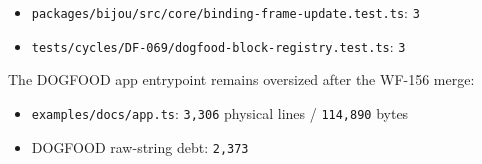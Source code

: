 \begin{itemize}
  \texttt{p\allowbreak{}a\allowbreak{}c\allowbreak{}k\allowbreak{}a\allowbreak{}g\allowbreak{}e\allowbreak{}s\allowbreak{}/\allowbreak{}b\allowbreak{}i\allowbreak{}j\allowbreak{}o\allowbreak{}u\allowbreak{}-\allowbreak{}t\allowbreak{}u\allowbreak{}i\allowbreak{}/\allowbreak{}s\allowbreak{}r\allowbreak{}c\allowbreak{}/\allowbreak{}s\allowbreak{}u\allowbreak{}b\allowbreak{}a\allowbreak{}p\allowbreak{}p\allowbreak{}/\allowbreak{}m\allowbreak{}o\allowbreak{}u\allowbreak{}n\allowbreak{}t\allowbreak{}.\allowbreak{}t\allowbreak{}s}: \texttt{3}
\item
  \texttt{p\allowbreak{}a\allowbreak{}c\allowbreak{}k\allowbreak{}a\allowbreak{}g\allowbreak{}e\allowbreak{}s\allowbreak{}/\allowbreak{}b\allowbreak{}i\allowbreak{}j\allowbreak{}o\allowbreak{}u\allowbreak{}/\allowbreak{}s\allowbreak{}r\allowbreak{}c\allowbreak{}/\allowbreak{}c\allowbreak{}o\allowbreak{}r\allowbreak{}e\allowbreak{}/\allowbreak{}b\allowbreak{}i\allowbreak{}n\allowbreak{}d\allowbreak{}i\allowbreak{}n\allowbreak{}g\allowbreak{}-\allowbreak{}f\allowbreak{}r\allowbreak{}a\allowbreak{}m\allowbreak{}e\allowbreak{}-\allowbreak{}u\allowbreak{}p\allowbreak{}d\allowbreak{}a\allowbreak{}t\allowbreak{}e\allowbreak{}.\allowbreak{}t\allowbreak{}e\allowbreak{}s\allowbreak{}t\allowbreak{}.\allowbreak{}t\allowbreak{}s}: \texttt{3}
\item
  \texttt{t\allowbreak{}e\allowbreak{}s\allowbreak{}t\allowbreak{}s\allowbreak{}/\allowbreak{}c\allowbreak{}y\allowbreak{}c\allowbreak{}l\allowbreak{}e\allowbreak{}s\allowbreak{}/\allowbreak{}D\allowbreak{}F\allowbreak{}-\allowbreak{}0\allowbreak{}6\allowbreak{}9\allowbreak{}/\allowbreak{}d\allowbreak{}o\allowbreak{}g\allowbreak{}f\allowbreak{}o\allowbreak{}o\allowbreak{}d\allowbreak{}-\allowbreak{}b\allowbreak{}l\allowbreak{}o\allowbreak{}c\allowbreak{}k\allowbreak{}-\allowbreak{}r\allowbreak{}e\allowbreak{}g\allowbreak{}i\allowbreak{}s\allowbreak{}t\allowbreak{}r\allowbreak{}y\allowbreak{}.\allowbreak{}t\allowbreak{}e\allowbreak{}s\allowbreak{}t\allowbreak{}.\allowbreak{}t\allowbreak{}s}: \texttt{3}
\end{itemize}

The DOGFOOD app entrypoint remains oversized after the WF-156 merge:

\begin{itemize}
\tightlist
\item
  \texttt{e\allowbreak{}x\allowbreak{}a\allowbreak{}m\allowbreak{}p\allowbreak{}l\allowbreak{}e\allowbreak{}s\allowbreak{}/\allowbreak{}d\allowbreak{}o\allowbreak{}c\allowbreak{}s\allowbreak{}/\allowbreak{}a\allowbreak{}p\allowbreak{}p\allowbreak{}.\allowbreak{}t\allowbreak{}s}: \texttt{3\allowbreak{},\allowbreak{}3\allowbreak{}0\allowbreak{}6} physical lines / \texttt{1\allowbreak{}1\allowbreak{}4\allowbreak{},\allowbreak{}8\allowbreak{}9\allowbreak{}0} bytes
\item
  DOGFOOD raw-string debt: \texttt{2\allowbreak{},\allowbreak{}3\allowbreak{}7\allowbreak{}3}
\end{itemize}

